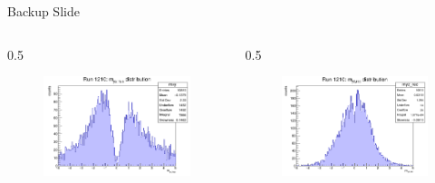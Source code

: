 \documentclass{beamer}[10pt]
\begin{document}
\begin{frame}{Backup Slide}
\begin{columns}
\begin{column}{0.5\framewidth}
  \begin{figure}[H]
    \centering
    \includegraphics[width= \textwidth]{figures/pdf/mxy.png}
    \label{fig:enter-label}
\end{figure}
\end{column}
\begin{column}{0.5\framewidth}
  \begin{figure}[H]
    \centering
    \includegraphics[width= \textwidth]{figures/pdf/myz_rec.png}
    \label{fig:enter-label}
\end{figure}
\vspace{-12mm}


\end{column}
\end{columns}
\end{frame}
\end{document}
